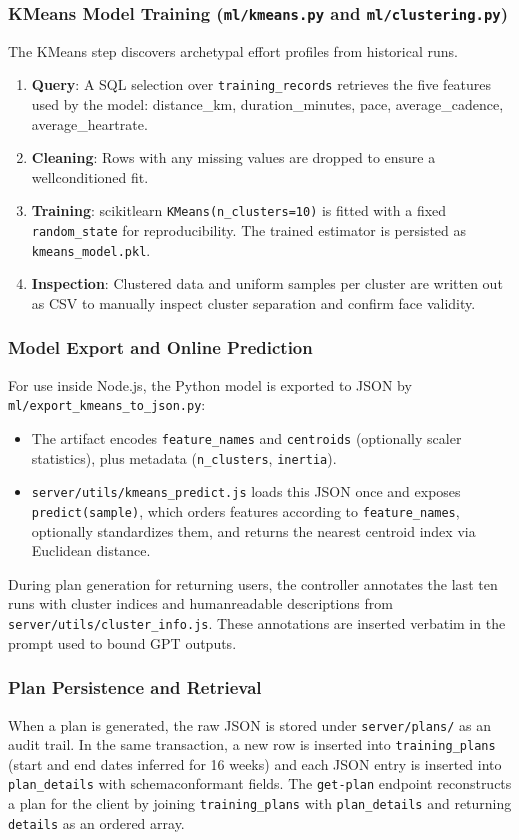 \subsubsection{KMeans Model Training (\verb|ml/kmeans.py| and \verb|ml/clustering.py|)}
The KMeans step discovers archetypal effort profiles from historical runs.
\begin{enumerate}
  \item \textbf{Query}: A SQL selection over \verb|training_records| retrieves the five features used by the model: distance\_km, duration\_minutes, pace, average\_cadence, average\_heartrate.
  \item \textbf{Cleaning}: Rows with any missing values are dropped to ensure a well\-conditioned fit.
  \item \textbf{Training}: scikit\-learn \verb|KMeans(n_clusters=10)| is fitted with a fixed \verb|random_state| for reproducibility. The trained estimator is persisted as \verb|kmeans_model.pkl|.
  \item \textbf{Inspection}: Clustered data and uniform samples per cluster are written out as CSV to manually inspect cluster separation and confirm face validity.
\end{enumerate}

\subsubsection{Model Export and Online Prediction}
For use inside Node.js, the Python model is exported to JSON by \verb|ml/export_kmeans_to_json.py|:
\begin{itemize}
  \item The artifact encodes \verb|feature_names| and \verb|centroids| (optionally scaler statistics), plus metadata (\verb|n_clusters|, \verb|inertia|).
  \item \verb|server/utils/kmeans_predict.js| loads this JSON once and exposes \verb|predict(sample)|, which orders features according to \verb|feature_names|, optionally standardizes them, and returns the nearest centroid index via Euclidean distance.
\end{itemize}
During plan generation for returning users, the controller annotates the last ten runs with cluster indices and human\-readable descriptions from \verb|server/utils/cluster_info.js|. These annotations are inserted verbatim in the prompt used to bound GPT outputs.

\subsubsection{Plan Persistence and Retrieval}
When a plan is generated, the raw JSON is stored under \verb|server/plans/| as an audit trail. In the same transaction, a new row is inserted into \verb|training_plans| (start and end dates inferred for 16 weeks) and each JSON entry is inserted into \verb|plan_details| with schema\-conformant fields. The \verb|get-plan| endpoint reconstructs a plan for the client by joining \verb|training_plans| with \verb|plan_details| and returning \verb|details| as an ordered array.

